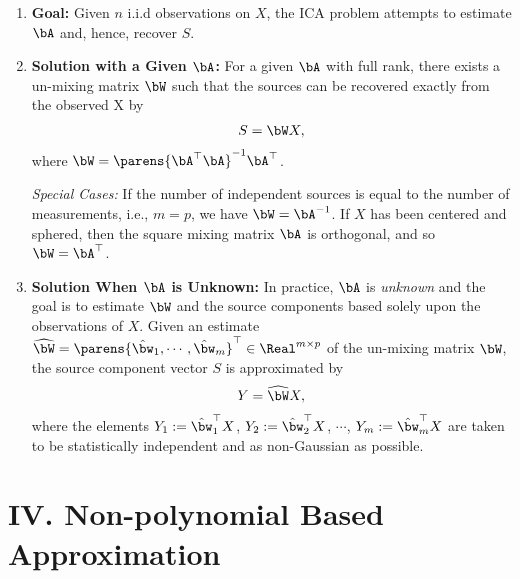 \documentclass[12pt]{article}
\begin{document}
\begin{enumerate}[label=\textbf{\arabic*.}]
	\item \textbf{Goal:} Given $n$ i.i.d observations on $X$, the ICA problem attempts to estimate $\bA$ and, hence, recover $S$. 

	\item \textbf{Solution with a Given $\bA$:} For a given $\bA$ with full rank, there exists a un-mixing matrix $\bW$ such that the sources can be recovered exactly from the observed X by 
	\begin{align}
		S = \bW X, 
	\end{align}
	where $\bW = \parens{\bA^\top \bA}^{-1} \bA^{\top}$. 
	
	\textit{Special Cases:} If the number of independent sources is equal to the number of measurements, i.e., $m = p$, we have $\bW = \bA^{-1}$. If $X$ has been centered and sphered, then the square mixing matrix $\bA$ is orthogonal, and so $\bW = \bA^{\top}$. 
	
	\item \textbf{Solution When $\bA$ is Unknown:} In practice, $\bA$ is \emph{unknown} and the goal is to estimate $\bW$ and the source components based solely upon the observations of $X$. Given an estimate $\widehat{\bW} = \parens{\hat{\bw}_1, \cdots, \hat{\bw}_m}^\top \in \Real^{m \times p}$ of the un-mixing matrix $\bW$, the source component vector $S$ is approximated by 
	\begin{align*}
		Y = \widehat{\bW} X, 
	\end{align*}
	where the elements $Y_1 := \hat{\bw}_1^\top X$, $Y_2 := \hat{\bw}_2^\top X$, $\cdots$, $Y_m := \hat{\bw}_m^\top X$ are taken to be statistically independent and as non-Gaussian as possible. 

\end{enumerate}


\section*{IV. Non-polynomial Based Approximation}
\end{document}
